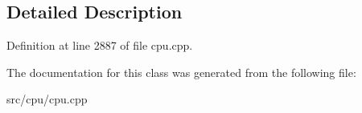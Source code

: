 \subsection{Detailed Description}


Definition at line 2887 of file cpu.\-cpp.



The documentation for this class was generated from the following file\-:\begin{DoxyCompactItemize}
\item 
src/cpu/cpu.\-cpp\end{DoxyCompactItemize}
